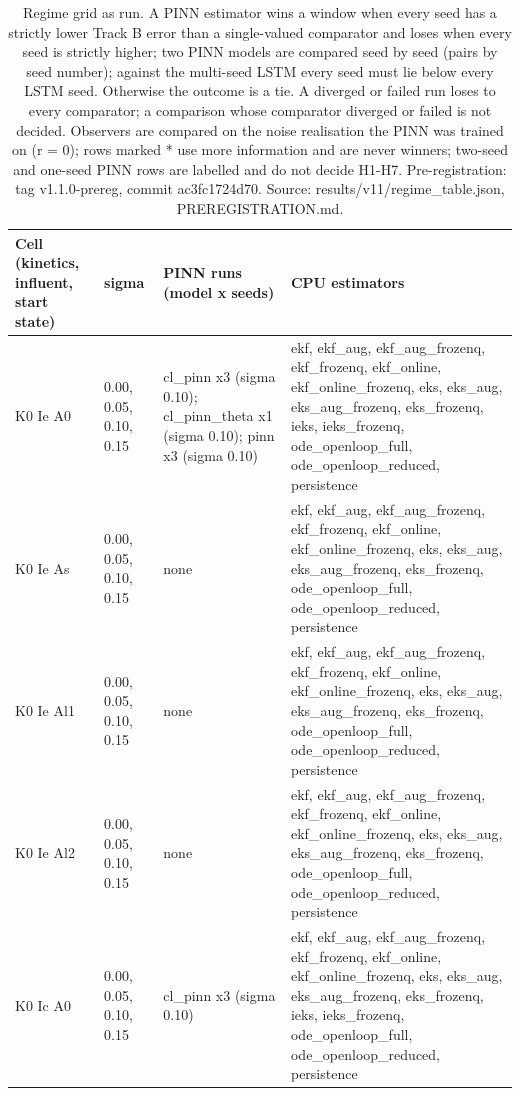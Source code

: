 \begin{table}[t]
\centering
\caption{Regime grid as run. A PINN estimator wins a window when every seed has a strictly lower Track B error than a single-valued comparator and loses when every seed is strictly higher; two PINN models are compared seed by seed (pairs by seed number); against the multi-seed LSTM every seed must lie below every LSTM seed. Otherwise the outcome is a tie. A diverged or failed run loses to every comparator; a comparison whose comparator diverged or failed is not decided. Observers are compared on the noise realisation the PINN was trained on (r = 0); rows marked * use more information and are never winners; two-seed and one-seed PINN rows are labelled and do not decide H1-H7. Pre-registration: tag v1.1.0-prereg, commit ac3fc1724d70. Source: results/v11/regime\_table.json, PREREGISTRATION.md.}
\label{tab:regimes}
\footnotesize
\begin{tabular}{llll}
\toprule
Cell (kinetics, influent, start state) & sigma & PINN runs (model x seeds) & CPU estimators \\
\midrule
K0 Ie A0 & 0.00, 0.05, 0.10, 0.15 & cl\_pinn x3 (sigma 0.10); cl\_pinn\_theta x1 (sigma 0.10); pinn x3 (sigma 0.10) & ekf, ekf\_aug, ekf\_aug\_frozenq, ekf\_frozenq, ekf\_online, ekf\_online\_frozenq, eks, eks\_aug, eks\_aug\_frozenq, eks\_frozenq, ieks, ieks\_frozenq, ode\_openloop\_full, ode\_openloop\_reduced, persistence \\
K0 Ie As & 0.00, 0.05, 0.10, 0.15 & none & ekf, ekf\_aug, ekf\_aug\_frozenq, ekf\_frozenq, ekf\_online, ekf\_online\_frozenq, eks, eks\_aug, eks\_aug\_frozenq, eks\_frozenq, ode\_openloop\_full, ode\_openloop\_reduced, persistence \\
K0 Ie Al1 & 0.00, 0.05, 0.10, 0.15 & none & ekf, ekf\_aug, ekf\_aug\_frozenq, ekf\_frozenq, ekf\_online, ekf\_online\_frozenq, eks, eks\_aug, eks\_aug\_frozenq, eks\_frozenq, ode\_openloop\_full, ode\_openloop\_reduced, persistence \\
K0 Ie Al2 & 0.00, 0.05, 0.10, 0.15 & none & ekf, ekf\_aug, ekf\_aug\_frozenq, ekf\_frozenq, ekf\_online, ekf\_online\_frozenq, eks, eks\_aug, eks\_aug\_frozenq, eks\_frozenq, ode\_openloop\_full, ode\_openloop\_reduced, persistence \\
K0 Ic A0 & 0.00, 0.05, 0.10, 0.15 & cl\_pinn x3 (sigma 0.10) & ekf, ekf\_aug, ekf\_aug\_frozenq, ekf\_frozenq, ekf\_online, ekf\_online\_frozenq, eks, eks\_aug, eks\_aug\_frozenq, eks\_frozenq, ieks, ieks\_frozenq, ode\_openloop\_full, ode\_openloop\_reduced, persistence \\

\end{tabular}
\end{table}

